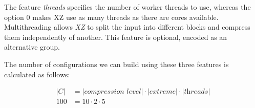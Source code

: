 The feature \emph{threads} specifies the number of worker threads to use, whereas the option $0$ makes \textsc{XZ}  use as many threads as there are cores available.
Multithreading allows \emph{XZ} to split the input into different blocks and compress them independently of another.
This feature is optional, encoded as an alternative group.


The number of configurations we can build using these three features is calculated as follows:

\begin{align}
    \lvert C \rvert &= \lvert \textit{compression level} \rvert \cdot \lvert \textit{extreme} \rvert \cdot \lvert \textit{threads} \rvert \\
    100 &= 10 \cdot 2 \cdot 5 \nonumber
\end{align}
